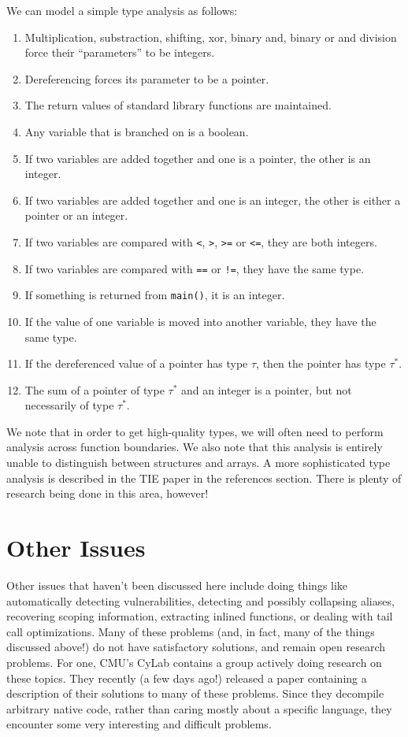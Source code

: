 \documentclass{article}
\begin{document}
We can model a simple type analysis as follows:
\begin{enumerate}
\item Multiplication, substraction, shifting, xor, binary and, binary or
	and division force their ``parameters'' to be integers.
\item Dereferencing forces its parameter to be a pointer.
\item The return values of standard library functions are maintained.
\item Any variable that is branched on is a boolean.
\item If two variables are added together and one is a pointer, the other is an integer.
\item If two variables are added together and one is an integer, the other is either a pointer
	or an integer.
\item If two variables are compared with \verb+<+, \verb+>+, \verb+>=+ or \verb+<=+,
	they are both integers.
\item If two variables are compared with \verb+==+ or \verb+!=+, they have the same type.
\item If something is returned from \verb+main()+, it is an integer.
\item If the value of one variable is moved into another variable, they have the same type.
\item If the dereferenced value of a pointer has type $\tau$, then the pointer has type
	$\tau^*$.
\item The sum of a pointer of type $\tau^*$ and an integer is a pointer, but not necessarily
of type $\tau^*$.
\end{enumerate}

We note that in order to get high-quality types, we will often need to perform analysis across
function boundaries. We also note that this analysis is entirely unable to distinguish between
structures and arrays. A more sophisticated type analysis is described in the TIE paper 
in the references section. There is plenty of research being done in this area, however!
\section{Other Issues}
Other issues that haven't been discussed here include doing things like automatically detecting
vulnerabilities, detecting and possibly collapsing aliases, recovering scoping information,
extracting inlined functions, or dealing with tail call optimizations. Many of these problems (and,
in fact, many of the things discussed above!) do not have satisfactory solutions, and remain open
research problems. For one, CMU's CyLab contains a group actively doing research on these topics.
They recently (a few days ago!) released a paper containing a description of their solutions to many 
of these problems. Since they decompile arbitrary native code, rather than caring mostly about
a specific language, they encounter some very interesting and difficult problems.
\end{document}

